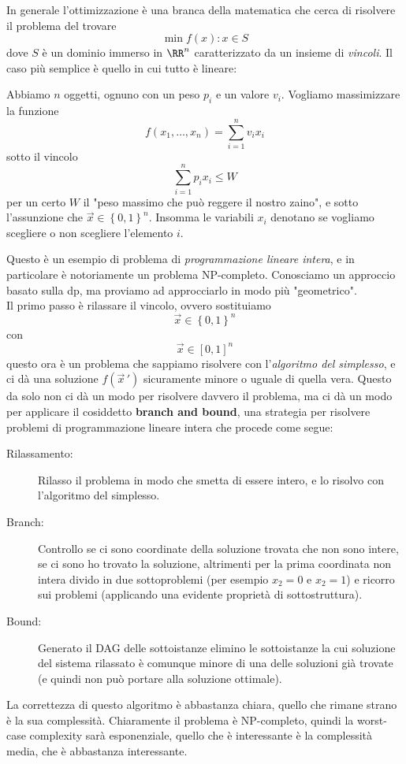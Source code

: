 \documentclass[11pt]{scrartcl}
\begin{document}
	In generale l'ottimizzazione è una branca della matematica che cerca di risolvere il problema del trovare
	$$\min f(x):x\in S$$
	dove $S$ è un dominio immerso in $\RR^n$ caratterizzato da un insieme di \textit{vincoli}. Il caso più semplice è quello in cui tutto è lineare:
	\begin{problem}[Knapsack]
		Abbiamo $n$ oggetti, ognuno con un peso $p_i$ e un valore $v_i$. Vogliamo massimizzare la funzione
		$$f(x_1,\dots,x_n)=\sum_{i=1}^{n}v_ix_i$$
		sotto il vincolo
		$$\sum_{i=1}^{n}p_ix_i\le W$$ 
		per un certo $W$ il "peso massimo che può reggere il nostro zaino", e sotto l'assunzione che $\vec{x}\in \left\{0,1\right\}^n$. Insomma le variabili $x_i$ denotano se vogliamo scegliere o non scegliere l'elemento $i$.
	\end{problem}
	Questo è un esempio di problema di \textit{programmazione lineare intera}, e in particolare è notoriamente un problema NP-completo. Conosciamo un approccio basato sulla dp, ma proviamo ad approcciarlo in modo più "geometrico". \\
	Il primo passo è rilassare il vincolo, ovvero sostituiamo 
	$$\vec{x}\in \left\{0,1\right\}^n$$
	con 
	$$\vec{x}\in [0,1]^n$$
	questo ora è un problema che sappiamo risolvere con l'\textit{algoritmo del simplesso}, e ci dà una soluzione $f(\vec{x}\,')$ sicuramente minore o uguale di quella vera. Questo da solo non ci dà un modo per risolvere davvero il problema, ma ci dà un modo per applicare il cosiddetto \textbf{branch and bound}, una strategia per risolvere problemi di programmazione lineare intera che procede come segue:
	\begin{description}
		\item[Rilassamento:] Rilasso il problema in modo che smetta di essere intero, e lo risolvo con l'algoritmo del simplesso.
		\item[Branch:] Controllo se ci sono coordinate della soluzione trovata che non sono intere, se ci sono ho trovato la soluzione, altrimenti per la prima coordinata non intera divido in due sottoproblemi (per esempio $x_2=0$ e $x_2=1$) e ricorro sui problemi (applicando una evidente proprietà di sottostruttura).
		\item[Bound:] Generato il DAG delle sottoistanze elimino le sottoistanze la cui soluzione del sistema rilassato è comunque minore di una delle soluzioni già trovate (e quindi non può portare alla soluzione ottimale).
	\end{description}
	La correttezza di questo algoritmo è abbastanza chiara, quello che rimane strano è la sua complessità. Chiaramente il problema è NP-completo, quindi la worst-case complexity sarà esponenziale, quello che è interessante è la complessità media, che è abbastanza interessante.
\end{document}
